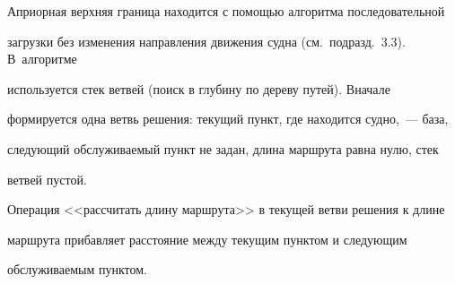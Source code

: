\vspace*{-2pt}





  Априорная верхняя граница находится с помощью алгоритма последовательной 


загрузки без изменения направления движения судна (см.\ подразд.~3.3). В~алгоритме 


используется стек ветвей (поиск в глубину по дереву путей). Вначале 


формируется одна ветвь решения: текущий пункт, где находится судно,~--- база, 


следующий обслуживаемый пункт не задан, длина маршрута равна нулю, стек 


ветвей пустой.


  


  Операция <<рассчитать длину маршрута>> в текущей ветви решения к длине 


маршрута прибавляет расстояние между текущим пунктом и следующим 


обслуживаемым пунктом.


